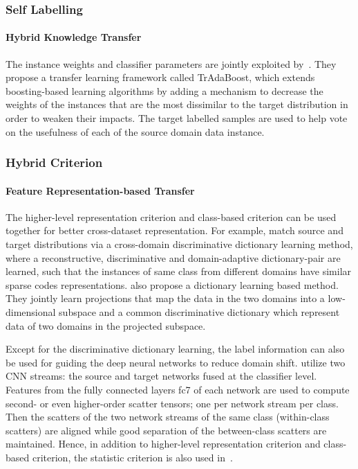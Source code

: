 \documentclass[prodmode]{acmsmall}  %
\begin{document}
\subsubsection{Self Labelling}
\paragraph{Hybrid Knowledge Transfer}
The instance weights and classifier parameters are jointly exploited by~\cite{Dai2007}. They propose a transfer learning framework called TrAdaBoost, which extends boosting-based learning algorithms by adding a mechanism to decrease the weights of the instances that are the most dissimilar to the target distribution in order to weaken their impacts. The target labelled samples are used to help vote on the usefulness of each of the source domain data instance.

\subsubsection{Hybrid Criterion}
\paragraph{Feature Representation-based Transfer}
The higher-level representation criterion and class-based criterion can be used together for better cross-dataset representation. For example,  match source and target distributions via a cross-domain discriminative dictionary learning method, where a reconstructive, discriminative and domain-adaptive dictionary-pair are learned, such that the instances of same class from different domains have similar sparse codes representations.  also propose a dictionary learning based method. They jointly learn projections that map the data in the two domains into a low-dimensional subspace and a common discriminative dictionary which represent data of two domains in the projected subspace.

Except for the discriminative dictionary learning, the label information can also be used for guiding the deep neural networks to reduce domain shift.  utilize two CNN streams: the source and target networks fused at the classifier level. Features from the fully connected layers fc7 of each network are used to compute second- or even higher-order scatter tensors; one per network stream per class. Then the scatters of the two network streams of the same class (within-class scatters) are aligned while good separation of the between-class scatters are maintained. Hence, in addition to higher-level representation criterion and class-based criterion, the statistic criterion is also used in~\cite{Koniusz2017}.
\end{document}
